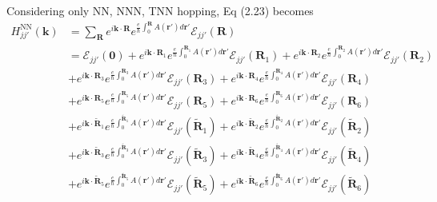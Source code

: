\documentclass{report}
\begin{document}
Considering only \ac{NN}, \ac{NNN}, \ac{TNN} hopping, Eq (2.23) becomes
\begin{equation}
	\begin{aligned}
		H_{jj'}^{\text{NN}}(\mathbf{k})
		 & = \sum_{\mathbf{R}} e^{i\mathbf{k\cdot R}} e^{\frac{e}{\hbar}\int_{0}^{\mathbf{R}}A(\mathbf{r'})d\mathbf{r'}} \mathcal{E}_{jj'}(\mathbf{R})                                                                                                                                                                                                \\
		 & = \mathcal{E}_{jj'}(\mathbf{0}) + e^{i\mathbf{k\cdot}\mathbf{R}_{1} }e^{\frac{e}{\hbar}\int_{0}^{\mathbf{R}_{1}}A(\mathbf{r'})d\mathbf{r'}} \mathcal{E}_{jj'}(\mathbf{R}_{1})  + e^{i\mathbf{k\cdot}\mathbf{R}_{2} }e^{\frac{e}{\hbar}\int_{0}^{\mathbf{R}_{2}}A(\mathbf{r'})d\mathbf{r'}} \mathcal{E}_{jj'}(\mathbf{R}_{2})               \\
		 & + e^{i\mathbf{k\cdot}\mathbf{R}_{3} }e^{\frac{e}{\hbar}\int_{0}^{\mathbf{R}_{3}}A(\mathbf{r'})d\mathbf{r'}} \mathcal{E}_{jj'}(\mathbf{R}_{3})+ e^{i\mathbf{k\cdot}\mathbf{R}_{4} }e^{\frac{e}{\hbar}\int_{0}^{\mathbf{R}_{4}}A(\mathbf{r'})d\mathbf{r'}} \mathcal{E}_{jj'}(\mathbf{R}_{4})                                                 \\
		 & + e^{i\mathbf{k\cdot}\mathbf{R}_{5} }e^{\frac{e}{\hbar}\int_{0}^{\mathbf{R}_{5}}A(\mathbf{r'})d\mathbf{r'}} \mathcal{E}_{jj'}(\mathbf{R}_{5})+ e^{i\mathbf{k\cdot}\mathbf{R}_{6} }e^{\frac{e}{\hbar}\int_{0}^{\mathbf{R}_{6}}A(\mathbf{r'})d\mathbf{r'}} \mathcal{E}_{jj'}(\mathbf{R}_{6})                                                 \\
		 & + e^{i\mathbf{k\cdot}\tilde{\mathbf{R}}_{1} }e^{\frac{e}{\hbar}\int_{0}^{\tilde{\mathbf{R}}_{1}}A(\mathbf{r'})d\mathbf{r'}} \mathcal{E}_{jj'}(\tilde{\mathbf{R}}_{1})+ e^{i\mathbf{k\cdot}\tilde{\mathbf{R}}_{2} }e^{\frac{e}{\hbar}\int_{0}^{\tilde{\mathbf{R}}_{2}}A(\mathbf{r'})d\mathbf{r'}} \mathcal{E}_{jj'}(\tilde{\mathbf{R}}_{2}) \\
		 & + e^{i\mathbf{k\cdot}\tilde{\mathbf{R}}_{3} }e^{\frac{e}{\hbar}\int_{0}^{\tilde{\mathbf{R}}_{3}}A(\mathbf{r'})d\mathbf{r'}} \mathcal{E}_{jj'}(\tilde{\mathbf{R}}_{3})+ e^{i\mathbf{k\cdot}\tilde{\mathbf{R}}_{4} }e^{\frac{e}{\hbar}\int_{0}^{\tilde{\mathbf{R}}_{4}}A(\mathbf{r'})d\mathbf{r'}} \mathcal{E}_{jj'}(\tilde{\mathbf{R}}_{4}) \\
		 & + e^{i\mathbf{k\cdot}\tilde{\mathbf{R}}_{5} }e^{\frac{e}{\hbar}\int_{0}^{\tilde{\mathbf{R}}_{5}}A(\mathbf{r'})d\mathbf{r'}} \mathcal{E}_{jj'}(\tilde{\mathbf{R}}_{5})+ e^{i\mathbf{k\cdot}\tilde{\mathbf{R}}_{6} }e^{\frac{e}{\hbar}\int_{0}^{\tilde{\mathbf{R}}_{6}}A(\mathbf{r'})d\mathbf{r'}} \mathcal{E}_{jj'}(\tilde{\mathbf{R}}_{6}) \\

\end{aligned}
\end{equation}
\end{document}
